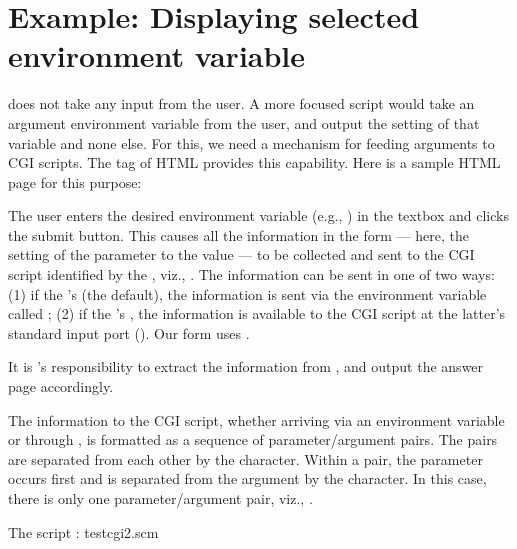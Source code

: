 \section{Example: Displaying selected environment variable}
\label{testcgi2}

 does not take any input from the user.
A more focused script would take an argument
environment variable from the user, and output the
setting of that variable and none else.  For this, we
need a mechanism for feeding arguments to CGI scripts.
The  tag of HTML provides this capability.
Here is a sample HTML page for this purpose:


\n The user enters the desired environment variable (e.g.,
)  in the
textbox and clicks the submit button.  This causes all
the information in the form — here, the setting of
the parameter  to the value
 — to be collected and sent to
the CGI script identified by the , viz.,
.    The information can be sent in one
of two ways: (1) if the ’s  (the
default), the information is sent via the environment
variable called ; (2) if the ’s
, the information is available to the
CGI script at the latter’s standard input port
().  Our form uses .

It is ’s responsibility to extract the
information from
, and output the answer page
accordingly.

The information to the CGI script, whether arriving via
an environment variable or through , is
formatted as a sequence of parameter/argument pairs.
The pairs are separated from each other by the \p{&}
character.  Within a pair, the parameter occurs first
and is separated from the argument by the \p{=}
character.  In this case, there is only
one parameter/argument pair, viz.,
.

The script :
\scmfilename testcgi2.scm

